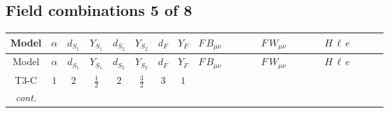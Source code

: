 \documentclass[8pt]{article}
\begin{document}
\begin{landscape}
\subsection*{Field combinations 5 of 8}
\begin{longtable}{@{}cccccccc >{\raggedright\arraybackslash}p{0.21\linewidth} >{\raggedright\arraybackslash}p{0.21\linewidth} >{\raggedright\arraybackslash}p{0.21\linewidth}@{}}
\toprule
Model & $\alpha$ & $d_{S_1}$ & $Y_{S_1}$ & $d_{S_2}$ & $Y_{S_2}$ & $d_F$ & $Y_F$ & $F\,B_{\mu\nu}$ & $F\,W_{\mu\nu}$ & $H\,\ell\,e$ \\
\midrule
\endfirsthead
\toprule
Model & $\alpha$ & $d_{S_1}$ & $Y_{S_1}$ & $d_{S_2}$ & $Y_{S_2}$ & $d_F$ & $Y_F$ & $F\,B_{\mu\nu}$ & $F\,W_{\mu\nu}$ & $H\,\ell\,e$ \\
\midrule
\endhead
T3-C & $1$ & $2$ & $\frac{1}{2}$ & $2$ & $\frac{3}{2}$ & $3$ & $1$ & \scriptsize\adjustbox{max width=\linewidth}{$\begin{gathered} -3 \hbar  \log \left(\frac{\bar{\mu}^{2}}{M_F^2}\right) B_{\mu _1\mu _2}^2\end{gathered}$} & \scriptsize\adjustbox{max width=\linewidth}{$\begin{gathered} -2 \hbar  \log \left(\frac{\bar{\mu}^{2}}{M_F^2}\right) \left(W_{\mu _1\mu _2}^{A_1}\right){}^2\end{gathered}$} & \scriptsize\adjustbox{max width=\linewidth}{$\begin{gathered} +\frac{\sqrt{3} \hbar  \overline{y_{1,i_3,r_1}} \overline{L_{a_1,i_2}}\, P_R\, e_{i_1} H_{a_1} y_{1,i_2,r_1} Y_{e,i_3,i_1}}{4 \epsilon } \\ +\frac{3}{8} \sqrt{3} \hbar  \overline{y_{1,i_3,r_1}} \overline{L_{a_1,i_2}}\, P_R\, e_{i_1} H_{a_1} y_{1,i_2,r_1} Y_{e,i_3,i_1} \\ +\frac{\sqrt{3} \hbar  \overline{y_{2,i_3,r_1}} \overline{L_{a_1,i_2}}\, P_R\, e_{i_1} H_{a_1} y_{2,i_2,r_1} Y_{e,i_3,i_1}}{4 \epsilon }\end{gathered}$} \\
\textit{cont.} &  &  &  &  &  &  &  &  &  & \scriptsize\adjustbox{max width=\linewidth}{$\begin{gathered} +\frac{3}{8} \sqrt{3} \hbar  \overline{y_{2,i_3,r_1}} \overline{L_{a_1,i_2}}\, P_R\, e_{i_1} H_{a_1} y_{2,i_2,r_1} Y_{e,i_3,i_1} \\ +\frac{\sqrt{3} \hbar  \overline{y_{1,i_1,r_1}} \overline{Y_{e,i_3,i_2}} \overline{e_{i_2}}\, P_L\, L_{a_1,i_1} y_{1,i_3,r_1} H_{a_1}{}^{\dagger }}{4 \epsilon } \\ +\frac{3}{8} \sqrt{3} \hbar  \overline{y_{1,i_1,r_1}} \overline{Y_{e,i_3,i_2}} \overline{e_{i_2}}\, P_L\, L_{a_1,i_1} y_{1,i_3,r_1} H_{a_1}{}^{\dagger }\end{gathered}$} \\

\end{longtable}
\end{landscape}
\end{document}
